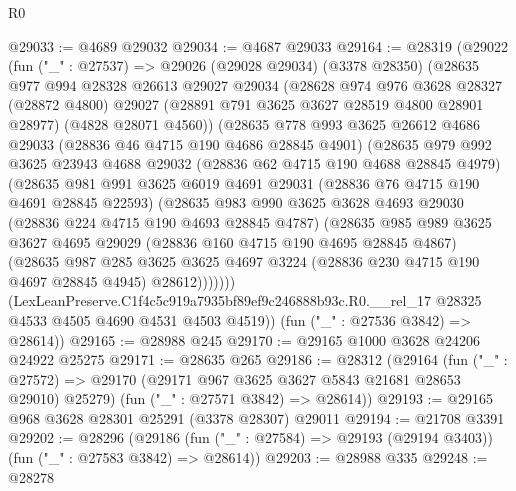 \begin{lexlean}{R0}
\begin{coremodule}
@29033 := @4689 @29032
@29034 := @4687 @29033
@29164 := @28319
    (@29022
      (fun ("_" : @27537) =>
      @29026
        (@29028 @29034)
        (@3378 @28350)
        (@28635
          @977
          @994
          @28328
          @26613
          @29027
          @29034
          (@28628
            @974
            @976
            @3628
            @28327
            (@28872 @4800)
            @29027
            (@28891 @791 @3625 @3627 @28519 @4800 @28901 @28977)
            (@4828 @28071 @4560))
          (@28635
            @778
            @993
            @3625
            @26612
            @4686
            @29033
            (@28836 @46 @4715 @190 @4686 @28845 @4901)
            (@28635
              @979
              @992
              @3625
              @23943
              @4688
              @29032
              (@28836 @62 @4715 @190 @4688 @28845 @4979)
              (@28635
                @981
                @991
                @3625
                @6019
                @4691
                @29031
                (@28836 @76 @4715 @190 @4691 @28845 @22593)
                (@28635
                  @983
                  @990
                  @3625
                  @3628
                  @4693
                  @29030
                  (@28836 @224 @4715 @190 @4693 @28845 @4787)
                  (@28635
                    @985
                    @989
                    @3625
                    @3627
                    @4695
                    @29029
                    (@28836 @160 @4715 @190 @4695 @28845 @4867)
                    (@28635
                      @987
                      @285
                      @3625
                      @3625
                      @4697
                      @3224
                      (@28836 @230 @4715 @190 @4697 @28845 @4945)
                      @28612)))))))
        (LexLeanPreserve.C1f4c5c919a7935bf89ef9c246888b93c.R0.__rel_17
          @28325
          @4533
          @4505
          @4690
          @4531
          @4503
          @4519))
      (fun ("_" : @27536 @3842) => @28614))
@29165 := @28988 @245
@29170 := @29165 @1000 @3628 @24206 @24922 @25275
@29171 := @28635 @265
@29186 := @28312
    (@29164
      (fun ("_" : @27572) => @29170 (@29171 @967 @3625 @3627 @5843 @21681 @28653 @29010) @25279)
      (fun ("_" : @27571 @3842) => @28614))
@29193 := @29165 @968 @3628 @28301 @25291 (@3378 @28307) @29011
@29194 := @21708 @3391
@29202 := @28296
    (@29186 (fun ("_" : @27584) => @29193 (@29194 @3403)) (fun ("_" : @27583 @3842) => @28614))
@29203 := @28988 @335
@29248 := @28278

\end{coremodule}
\end{lexlean}

